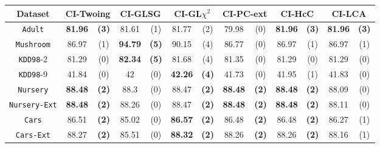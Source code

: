 \begin{table}
\scriptsize
\centering
\begin{tabular}{c|cc|cc|cc|cc|cc|cc} 
Dataset  &   \multicolumn{2}{c|}{CI-Twoing} &   \multicolumn{2}{c|}{CI-GLSG} & \multicolumn{2}{c|}{CI-GL$\chi^2$}& \multicolumn{2}{c|}{CI-PC-ext}& \multicolumn{2}{c|}{CI-HcC}& \multicolumn{2}{c}{CI-LCA}\\
\hline   
{\tt Adult}        &{\bf 81.96} &{\bf  (3)} & 81.61       & (1)       & 81.77       & (2)       & 79.98       & (0)       & {\bf 81.96} & {\bf  (3)}  & {\bf 81.96} & {\bf  (3)}  \\
{\tt Mushroom}     &86.97       & (1)       &{\bf  94.79 }& {\bf (5)} & 90.15       & (4)       & 86.77       & (0)       & 86.97       & (1)         & 86.97       & (1)         \\
{\tt KDD98}-2      &81.29       & (0)       & {\bf 82.34 }& {\bf (5)} & 81.68       & (4)       & 81.35       & (0)       & 81.29       & (0)         & 81.29       & (0)         \\
{\tt KDD98}-9      &41.84       & (0)       & 42          & (0)       & {\bf 42.26} & {\bf (4)} & 41.73       & (0)       & 41.95       &  (1)        & 41.83       & (0)         \\
{\tt Nursery}      &{\bf 88.48} & {\bf (2)} & 88.3        & (0)       & 88.47       & {\bf (2)} &{\bf 88.48 } & {\bf (2)} & {\bf 88.48} & {\bf (2)}   & 88.09       & (0)         \\
{\tt Nursery-Ext}  &{\bf 88.48} & {\bf (2)} & 88.26       & (0)       & 88.47       & {\bf (2)} &{\bf 88.48 } & {\bf (2)} & {\bf 88.48} & {\bf (2)}   & 88.11       & (0)         \\
{\tt Cars}         &86.51       & {\bf (2)} & 85.02       & (0)       & {\bf 86.57} & {\bf (2)} & 86.48       & {\bf (2)} & 86.48       & {\bf (2)}   & 86.27       & (1)         \\
{\tt Cars-Ext}     &88.27       & {\bf (2)} & 85.51       & (0)       & {\bf 88.32} & {\bf (2)} & 88.26       & {\bf (2)} & 88.26       & {\bf (2)}   & 88.16       & (1)         \\

\end{tabular}
\end{table}
